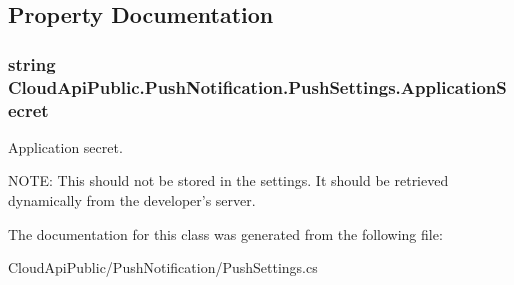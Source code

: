 \subsection{Property Documentation}
\hypertarget{class_cloud_api_public_1_1_push_notification_1_1_push_settings_a2984eb5cc9475a60bf5bdb9819d485ca}{
\subsubsection[{Application\-Secret}]{\setlength{\rightskip}{0pt plus 5cm}string Cloud\-Api\-Public.\-Push\-Notification.\-Push\-Settings.\-Application\-Secret\hspace{0.3cm}{\ttfamily [get]}}}\label{class_cloud_api_public_1_1_push_notification_1_1_push_settings_a2984eb5cc9475a60bf5bdb9819d485ca}


Application secret. 

N\-O\-T\-E\-: This should not be stored in the settings. It should be retrieved dynamically from the developer's server.

The documentation for this class was generated from the following file\-:\begin{DoxyCompactItemize}
\item 
Cloud\-Api\-Public/\-Push\-Notification/Push\-Settings.\-cs\end{DoxyCompactItemize}
